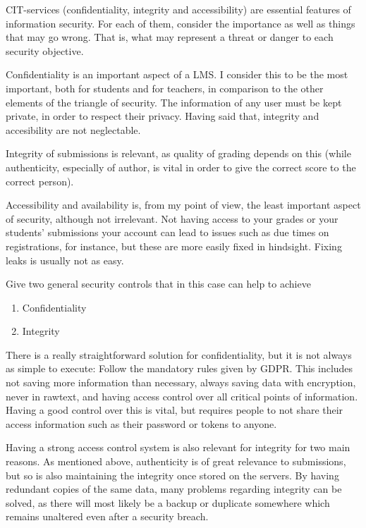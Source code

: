 \documentclass{myassignment}
\begin{document}
	\begin{problem}
		CIT-services (confidentiality, integrity and accessibility) are essential features of information security. For each of them, consider the importance as well as things that may go wrong. That is, what may represent a threat or danger to each security objective.%
	\end{problem}

	\begin{answer}
		Confidentiality is an important aspect of a LMS. I consider this to be the most important, both for students and for teachers, in comparison to the other elements of the triangle of security. The information of any user must be kept private, in order to respect their privacy. Having said that, integrity and accesibility are not neglectable.

		Integrity of submissions is relevant, as quality of grading depends on this (while authenticity, especially of author, is vital in order to give the correct score to the correct person).
		
		Accessibility and availability is, from my point of view, the least important aspect of security, although not irrelevant. Not having access to your grades or your students' submissions your account can lead to issues such as due times on registrations, for instance, but these are more easily fixed in hindsight. Fixing leaks is usually not as easy.
	\end{answer}

	\begin{problem}
		Give two general security controls that in this case can help to achieve%
		\begin{enumerate}[label=\alph*),leftmargin=7em]
			\setlength\itemsep{0.5em}
			\item Confidentiality%
			\item Integrity%
		\end{enumerate}
	\end{problem}

	\begin{answer}
		There is a really straightforward solution for confidentiality, but it is not always as simple to execute: Follow the mandatory rules given by GDPR. This includes not saving more information than necessary, always saving data with encryption, never in rawtext, and having access control over all critical points of information. Having a good control over this is vital, but requires people to not share their access information such as their password or tokens  to anyone. 

		Having a strong access control system is also relevant for integrity for two main reasons. As mentioned above, authenticity is of great relevance to submissions, but so is also maintaining the integrity once stored on the servers. By having redundant copies of the same data, many problems regarding integrity can be solved, as there will most likely be a backup or duplicate somewhere which remains unaltered even after a security breach.
	\end{answer}
\end{document}
